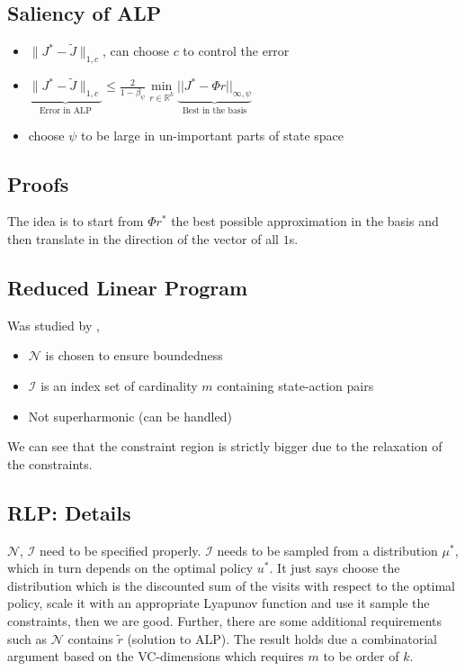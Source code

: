 \documentclass{article}
\newcommand{\R}{\mathbb{R}}
\newcommand{\tj}{\tilde{J}}
\newcommand{\tr}{\tilde{r}}
\newcommand{\norm}[1]{\|#1\|}
\newcommand{\N}{\mathcal{N}}
\newcommand{\I}{\mathcal{I}}
\begin{document}
\subsection{Saliency of ALP}
\begin{itemize}
\item $\norm{J^*-\tj}_{1,c}$, can choose $c$ to control the error
\item $\underbrace{\norm{J^*-\tj}_{1,c}}_{\text{Error in ALP}}\leq \frac{2}{1-\beta_\psi}\underset{r\in \R^k}{\min}\underbrace{||J^*-\Phi r||_{\infty,\psi}}_{\text{Best in the basis}}$
\item \cite{de2003linear,de2004constraint} choose $\psi$ to be large in un-important parts of state space
\end{itemize}

\subsection{Proofs}
The idea is to start from $\Phi r^*$ the best possible approximation in the basis and then translate in the direction of the vector of all $1$s.
\subsection{Reduced Linear Program}
Was studied by \cite{de2004constraint},
\begin{itemize}
\item $\N$ is chosen to ensure boundedness
\item $\I$ is an index set of cardinality $m$ containing state-action pairs
\item Not superharmonic (can be handled)
\end{itemize}
We can see that the constraint region is strictly bigger due to the relaxation of the constraints.

\subsection{RLP: Details}
$\N$, $\I$ need to be specified properly. $\I$ needs to be sampled from a distribution $\mu^*$, which in turn depends on the optimal policy $u^*$. It just says choose the distribution which is the discounted sum of the visits with respect to the optimal policy, scale it with an appropriate Lyapunov function and use it sample the constraints, then we are good. Further, there are some additional requirements such as $\N$ contains $\tr$ (solution to ALP). The result holds due a combinatorial argument based on the VC-dimensions which requires $m$ to be order of $k$.
\end{document}
